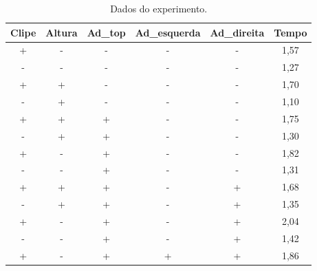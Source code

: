 \begin{table}[H]
  \centering
  \caption{Dados do experimento.}
  \begin{tabular}{|c|c|c|c|c|c|}
  \hline
  \rowcolor[HTML]{EFEFEF} 
  \textbf{Clipe} & \textbf{Altura} & \textbf{Ad\_top} & \textbf{Ad\_esquerda} & \textbf{Ad\_direita} & \textbf{Tempo} \\ \hline
  +              & -               & -                & -                 & -                  & 1,57           \\ \hline
  \rowcolor[HTML]{EFEFEF} 
  -              & -               & -                & -                 & -                  & 1,27           \\ \hline
  +              & +               & -                & -                 & -                  & 1,70           \\ \hline
  \rowcolor[HTML]{EFEFEF} 
  -              & +               & -                & -                 & -                  & 1,10           \\ \hline
  +              & +               & +                & -                 & -                  & 1,75           \\ \hline
  \rowcolor[HTML]{EFEFEF} 
  -              & +               & +                & -                 & -                  & 1,30           \\ \hline
  +              & -               & +                & -                 & -                  & 1,82           \\ \hline
  \rowcolor[HTML]{EFEFEF} 
  -              & -               & +                & -                 & -                  & 1,31           \\ \hline
  +              & +               & +                & -                 & +                  & 1,68           \\ \hline
  \rowcolor[HTML]{EFEFEF} 
  -              & +               & +                & -                 & +                  & 1,35           \\ \hline
  +              & -               & +                & -                 & +                  & 2,04           \\ \hline
  \rowcolor[HTML]{EFEFEF} 
  -              & -               & +                & -                 & +                  & 1,42           \\ \hline
  +              & -               & +                & +                 & +                  & 1,86           \\ \hline

\end{tabular}
\end{table}
